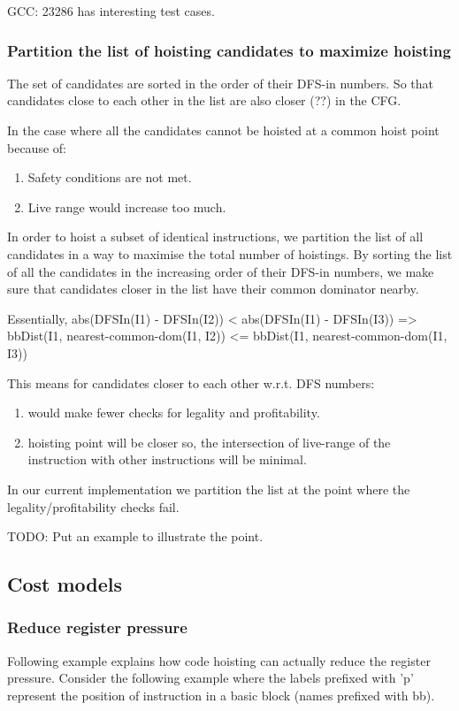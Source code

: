\documentclass{sig-alternate}
\begin{document}
GCC: 23286 has interesting test cases.

\subsubsection{Partition the list of hoisting candidates to maximize hoisting}
\label{subsec:partition}
The set of candidates are sorted in the order of their DFS-in
numbers. So that candidates close to each other in the list are also
closer (??) in the CFG.

In the case where all the candidates cannot be hoisted at a common
hoist point because of:
\begin{enumerate}
\item Safety conditions are not met.
\item Live range would increase too much.
\end{enumerate}

In order to hoist a subset of identical instructions, we partition the
list of all candidates in a way to maximise the total number of
hoistings.  By sorting the list of all the candidates in the
increasing order of their DFS-in numbers, we make sure that candidates
closer in the list have their common dominator nearby.

Essentially,
abs(DFSIn(I1) - DFSIn(I2)) < abs(DFSIn(I1) - DFSIn(I3))
=> bbDist(I1, nearest-common-dom(I1, I2)) <= bbDist(I1, nearest-common-dom(I1, I3))

This means for candidates closer to each other w.r.t. DFS numbers:
\begin{enumerate}
\item would make fewer checks for legality and profitability.
\item hoisting point will be closer so, the intersection of live-range of the
  instruction with other instructions will be minimal.
\end{enumerate}

In our current implementation we partition the list at the point where the
legality/profitability checks fail.

TODO: Put an example to illustrate the point.

\subsection{Cost models}

\subsubsection{Reduce register pressure}
\label{hoist:reg-pressure}
Following example explains how code hoisting can actually reduce the register pressure.
Consider the following example where the labels prefixed with 'p' represent the position of
instruction in a basic block (names prefixed with bb).
\end{document}
